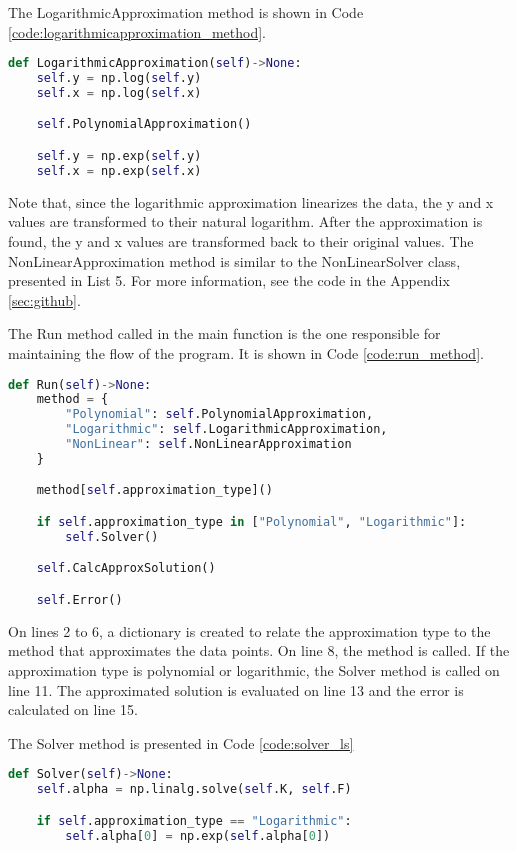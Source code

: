 The LogarithmicApproximation method is shown in Code \ref{code:logarithmicapproximation_method}.
\begin{lstlisting}[caption={LogarithmicApproximation method},label={code:logarithmicapproximation_method},language=python]
def LogarithmicApproximation(self)->None:
    self.y = np.log(self.y)
    self.x = np.log(self.x)

    self.PolynomialApproximation()

    self.y = np.exp(self.y)
    self.x = np.exp(self.x)
\end{lstlisting}

Note that, since the logarithmic approximation linearizes the data, the y and x values are transformed to their natural logarithm. After the approximation is found, the y and x values are transformed back to their original values. The NonLinearApproximation method is similar to the NonLinearSolver class, presented in List 5. For more information, see the code in the Appendix \ref{sec:github}.

The Run method called in the main function is the one responsible for maintaining the flow of the program. It is shown in Code \ref{code:run_method}.
\begin{lstlisting}[caption={Run method},label={code:run_method},language=python]
def Run(self)->None:
    method = {
        "Polynomial": self.PolynomialApproximation,
        "Logarithmic": self.LogarithmicApproximation,
        "NonLinear": self.NonLinearApproximation
    }

    method[self.approximation_type]()

    if self.approximation_type in ["Polynomial", "Logarithmic"]:
        self.Solver()

    self.CalcApproxSolution()

    self.Error()
\end{lstlisting}

On lines 2 to 6, a dictionary is created to relate the approximation type to the method that approximates the data points. On line 8, the method is called. If the approximation type is polynomial or logarithmic, the Solver method is called on line 11. The approximated solution is evaluated on line 13 and the error is calculated on line 15. 

The Solver method is presented in Code \ref{code:solver_ls}
\begin{lstlisting}[caption={Solver method},label={code:solver_ls},language=python]
def Solver(self)->None:
    self.alpha = np.linalg.solve(self.K, self.F)

    if self.approximation_type == "Logarithmic":
        self.alpha[0] = np.exp(self.alpha[0])
\end{lstlisting}

